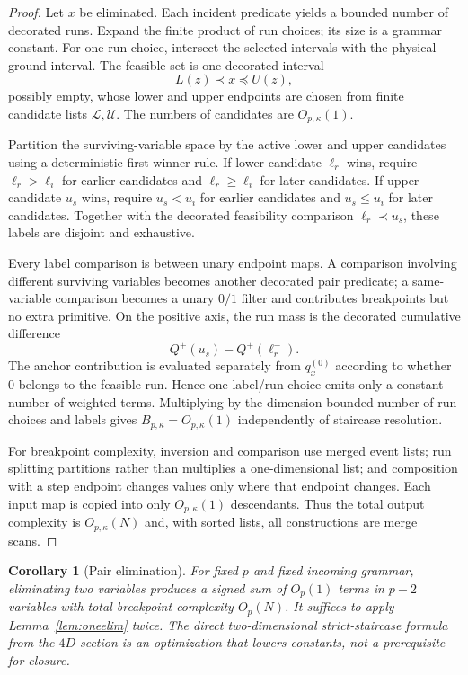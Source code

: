 \documentclass[12pt,a4paper]{article}
\newtheorem{corollary}[theorem]{Corollary}
\theoremstyle{definition}
\newcommand{\1}{\mathbf 1}
\begin{document}
\begin{proof}
Let $x$ be eliminated. Each incident predicate yields a bounded number of decorated runs. Expand the finite product of run choices; its size is a grammar constant. For one run choice, intersect the selected intervals with the physical ground interval. The feasible set is one decorated interval
\[
L(z)\prec x\preceq U(z),
\]
possibly empty, whose lower and upper endpoints are chosen from finite candidate lists $\mathcal L,\mathcal U$. The numbers of candidates are $O_{p,\kappa}(1)$.

Partition the surviving-variable space by the active lower and upper candidates using a deterministic first-winner rule. If lower candidate $\ell_r$ wins, require $\ell_r>\ell_i$ for earlier candidates and $\ell_r\ge\ell_i$ for later candidates. If upper candidate $u_s$ wins, require $u_s<u_i$ for earlier candidates and $u_s\le u_i$ for later candidates. Together with the decorated feasibility comparison $\ell_r\prec u_s$, these labels are disjoint and exhaustive.

Every label comparison is between unary endpoint maps. A comparison involving different surviving variables becomes another decorated pair predicate; a same-variable comparison becomes a unary $0/1$ filter and contributes breakpoints but no extra primitive. On the positive axis, the run mass is the decorated cumulative difference
\[
Q^+(u_s)-Q^+(\ell_r^-).
\]
The anchor contribution is evaluated separately from $q_x^{(0)}$ according to whether $0$ belongs to the feasible run. Hence one label/run choice emits only a constant number of weighted terms. Multiplying by the dimension-bounded number of run choices and labels gives $B_{p,\kappa}=O_{p,\kappa}(1)$ independently of staircase resolution.

For breakpoint complexity, inversion and comparison use merged event lists; run splitting partitions rather than multiplies a one-dimensional list; and composition with a step endpoint changes values only where that endpoint changes. Each input map is copied into only $O_{p,\kappa}(1)$ descendants. Thus the total output complexity is $O_{p,\kappa}(N)$ and, with sorted lists, all constructions are merge scans.
\end{proof}

\begin{corollary}[Pair elimination]                             \label{lem:pairelim}
For fixed $p$ and fixed incoming grammar, eliminating two variables produces a signed sum of $O_p(1)$ terms in $p-2$ variables with total breakpoint complexity $O_p(N)$. It suffices to apply Lemma~\ref{lem:oneelim} twice. The direct two-dimensional strict-staircase formula from the $4D$ section is an optimization that lowers constants, not a prerequisite for closure.
\end{corollary}
\end{document}
